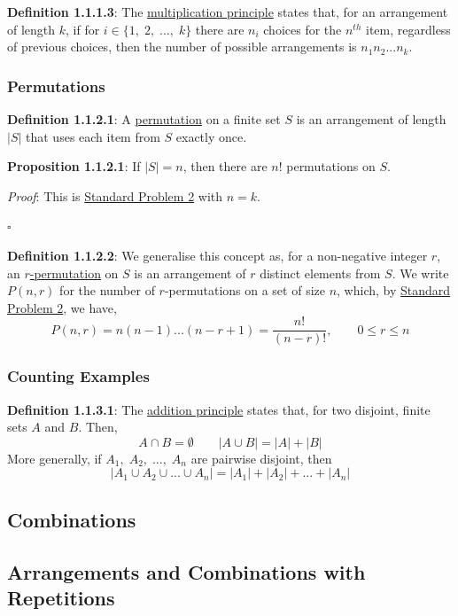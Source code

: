 \documentclass{article}
\newcommand{\separate}[1] {\vspace{#1 pt}\noindent}
\newcommand{\definition}[2]{\textbf{Definition #1}: #2\label{def:#1}}
\newcommand{\proof}[2]{\textit{Proof}: #2 \begin{flushright}\(\square\)\end{flushright}\label{prf:#1}}
\newcommand{\proposition}[3]{\textbf{Proposition #1}: #2 \par\separate{3}\proof{prop:#1}{#3}\label{prop:#1}}
\begin{document}
\separate{7}\definition{1.1.1.3}{The \underline{multiplication principle} states that, for an arrangement of length \(k\), if for \(i \in \{1,\;2,\;...,\;k\}\) there are \(n_i\) choices for the \(n^{th}\) item, regardless of previous choices, then the number of possible arrangements is \(n_1n_2...n_k\).}

\subsubsection{Permutations}

\definition{1.1.2.1}{A \underline{permutation} on a finite set \(S\) is an arrangement of length \(|S|\) that uses each item from \(S\) exactly once.}

\separate{7}\proposition{1.1.2.1}{If \(|S|=n\), then there are \(n!\) permutations on \(S\).}
{This is \hyperref[prob:2]{Standard Problem 2} with \(n=k\).}

\separate{7}\definition{1.1.2.2}{We generalise this concept as, for a non-negative integer \(r\), an \underline{\(r\)-permutation} on \(S\) is an arrangement of \(r\) distinct elements from \(S\). We write \(P(n,r)\) for the number of \(r\)-permutations on a set of size \(n\), which, by \hyperref[prob:2]{Standard Problem 2}, we have,
\begin{equation}
    P(n,r) = n(n-1)...(n-r+1) = \frac{n!}{(n-r)!},\qquad 0 \leq r \leq n
\end{equation}}

\subsubsection{Counting Examples}

\definition{1.1.3.1}{The \underline{addition principle} states that, for two disjoint, finite sets \(A\) and \(B\). Then,
\begin{equation}
    A \cap B = \emptyset \qquad |A \cup B| = |A| + |B|
\end{equation}
More generally, if \(A_1,\;A_2,\;...,\;A_n\) are pairwise disjoint, then
\begin{equation}
    |A_1 \cup A_2 \cup ... \cup A_n| = |A_1| + |A_2| + ... + |A_n|
\end{equation}}

\subsection{Combinations}

\subsection{Arrangements and Combinations with Repetitions}
\end{document}
